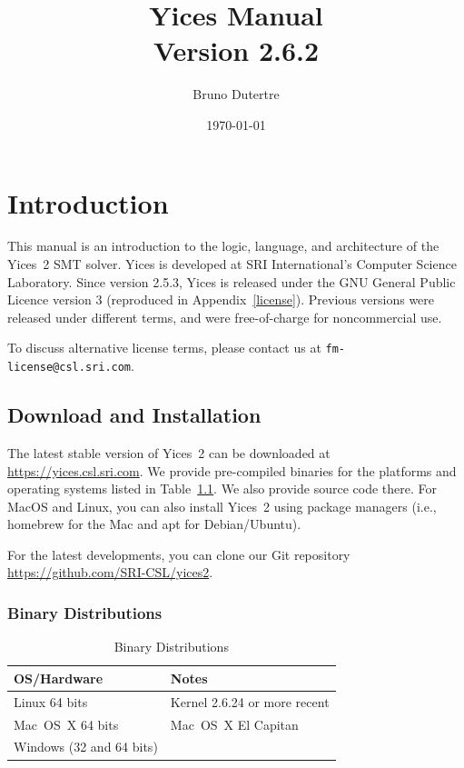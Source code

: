 \documentclass[11pt,twoside,fleqn,openright,titlepage]{cslreport}
\begin{document}
\begin{titlepage}
\date{\today}
\author{Bruno Dutertre}
\title{\textbf{Yices Manual\\[0.6em]
Version 2.6.2}}
\end{titlepage}

\maketitle
\cleardoublepageblank
\tableofcontents
\cleardoublepage
\setcounter{page}{0}


\chapter{Introduction}

This  manual   is  an  introduction   to  the  logic,   language,  and
architecture  of the  Yices~2 SMT  solver. Yices  is developed  at SRI
International's  Computer Science  Laboratory.   Since version  2.5.3,
Yices  is released  under the  GNU  General Public  Licence version  3
(reproduced  in   Appendix~\ref{license}).   Previous   versions  were
released   under  different   terms,  and   were  free-of-charge   for
noncommercial use.

\medskip\noindent
To discuss alternative license terms, please contact us at
\texttt{fm-license@csl.sri.com}.


\section{Download and Installation}

The latest stable version of Yices~2 can be downloaded at
\url{https://yices.csl.sri.com}.  We provide pre-compiled binaries for
the platforms and operating systems listed in Table~\ref{versions}. We
also provide source code there. For MacOS and Linux, you can also
install Yices~2 using package managers (i.e., homebrew for the Mac and
apt for Debian/Ubuntu).

\medskip\noindent
For the latest developments, you can clone our Git repository
\url{https://github.com/SRI-CSL/yices2}.


\subsection{Binary Distributions}

\begin{table}
\begin{center}
\renewcommand{\arraystretch}{1.1}
\begin{tabular}{|l|l|}
\hline
\textbf{OS/Hardware} & \textbf{Notes} \\
\hline
\hline
Linux 64 bits & Kernel 2.6.24 or more recent \\
\hline
Mac~OS~X 64 bits &  Mac~OS~X El Capitan\\
\hline
Windows (32 and 64 bits) & \\
\hline
\end{tabular}
\end{center}
\caption{Binary Distributions}
\label{versions}
\end{table}
\end{document}
